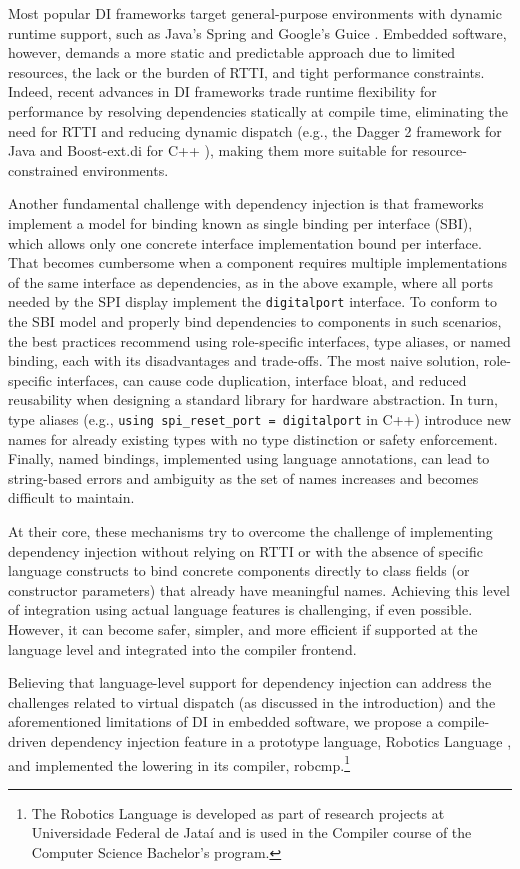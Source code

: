 \documentclass[sigconf]{acmart}
\newcommand{\blindreview}[1]{#1}
\begin{document}
Most popular DI frameworks target general-purpose environments with dynamic runtime support, such as Java's Spring \cite{walls2022spring} and Google's Guice \cite{schaefer2008guice}. Embedded software, however, demands a more static and predictable approach due to limited resources, the lack or the burden of RTTI, and tight performance constraints. Indeed, recent advances in DI frameworks trade runtime flexibility for performance by resolving dependencies statically at compile time, eliminating the need for RTTI and reducing dynamic dispatch (e.g., the Dagger 2 framework \cite{dagger2} for Java and Boost-ext.di for C++ \cite{boostdi2018}), making them more suitable for resource-constrained environments.

Another fundamental challenge with dependency injection is that frameworks implement a model for binding known as single binding per interface (SBI), which allows only one concrete interface implementation bound per interface. That becomes cumbersome when a component requires multiple implementations of the same interface as dependencies, as in the above example, where all ports needed by the SPI display implement the {\tt digitalport} interface. To conform to the SBI model and properly bind dependencies to components in such scenarios, the best practices recommend using role-specific interfaces, type aliases, or named binding, each with its disadvantages and trade-offs. The most naive solution, role-specific interfaces, can cause code duplication, interface bloat, and reduced reusability when designing a standard library for hardware abstraction. In turn, type aliases (e.g., {\tt using spi\_reset\_port = digitalport} in C++) introduce new names for already existing types with no type distinction or safety enforcement. Finally, named bindings, implemented using language annotations, can lead to string-based errors and ambiguity as the set of names increases and becomes difficult to maintain.

At their core, these mechanisms try to overcome the challenge of implementing dependency injection without relying on RTTI or with the absence of specific language constructs to bind concrete components directly to class fields (or constructor parameters) that already have meaningful names. Achieving this level of integration using actual language features is challenging, if even possible. However, it can become safer, simpler, and more efficient if supported at the language level and integrated into the compiler frontend.

Believing that language-level support for dependency injection can address the challenges related to virtual dispatch (as discussed in the introduction) and the aforementioned limitations of DI in embedded software, we propose a compile-driven dependency injection feature in a prototype language, \blindreview{Robotics Language \cite{robcmp}}, and implemented the lowering in its compiler, \blindreview{robcmp.\footnote{The Robotics Language is developed as part of research projects at Universidade Federal de Jataí and is used in the Compiler course of the Computer Science Bachelor's program.}}
\end{document}

